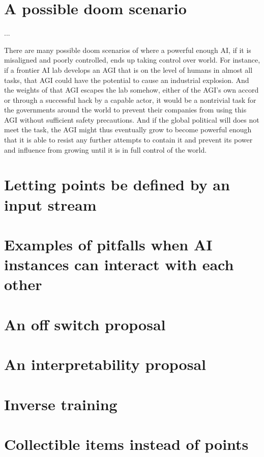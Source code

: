 \documentclass{article}
\begin{document}
\begin{appendices}



\section{A possible doom scenario}\label{doom}

...


There are many possible doom scenarios of where a powerful enough AI, if it is misaligned and poorly controlled, ends up taking control over world. For instance, if a frontier AI lab develops an AGI that is on the level of humans in almost all tasks, that AGI could have the potential to cause an industrial explosion. And the weights of that AGI escapes the lab somehow, either of the AGI's own accord or through a successful hack by a capable actor, it would be a nontrivial task for the governments around the world to prevent their companies from using this AGI without sufficient safety precautions. And if the global political will does not meet the task, the AGI might thus eventually grow to become powerful enough that it is able to resist any further attempts to contain it and prevent its power and influence from growing until it is in full control of the world.



\section{Letting points be defined by an input stream}\label{feedback-defined points}


\section{Examples of pitfalls when AI instances can interact with each other}\label{pitfalls with multiple instances}


\section{An off switch proposal}\label{off swtich proposal}



\section{An interpretability proposal}


\section{Inverse training}



\section{Collectible items instead of points}




\end{appendices}
\end{document}
